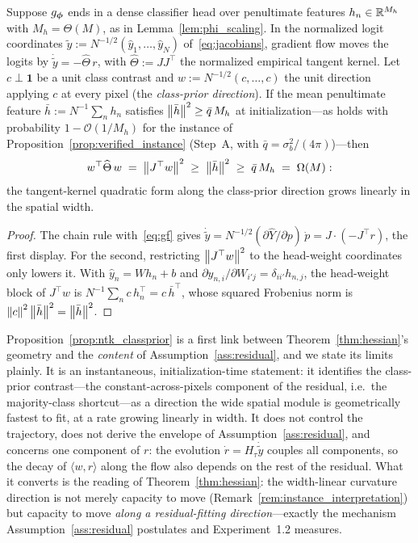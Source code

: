 \begin{proposition}
\label{prop:ntk_classprior}
Suppose $g_{\boldsymbol{\phi}}$ ends in a dense classifier head over penultimate
features $h_n \in \mathbb{R}^{M_h}$ with $M_h = \Theta(M)$, as in
Lemma~\ref{lem:phi_scaling}. In the normalized logit coordinates
$\tilde{y} := N^{-1/2}(\hat{y}_1, \dots, \hat{y}_N)$
of~\eqref{eq:jacobians}, gradient flow moves the logits by
$\dot{\tilde{y}} = -\widehat{\Theta}\,r$, with
$\widehat{\Theta} := J J^\top$ the normalized empirical tangent
kernel. Let $c \perp \mathbf{1}$ be a unit class contrast and
$w := N^{-1/2}(c, \dots, c)$ the unit direction applying $c$ at
every pixel (the \emph{class-prior direction}). If the mean
penultimate feature $\bar{h} := N^{-1}\sum_n h_n$ satisfies
$\left\lVert\bar{h}\right\rVert^2 \geq \bar{q}\,M_h$ at initialization---as holds
with probability $1 - \mathcal{O}(1/M_h)$ for the instance of
Proposition~\ref{prop:verified_instance} (Step~A, with
$\bar{q} = \sigma_b^2/(4\pi)$)---then
\[
    w^\top \widehat{\Theta}\,w
    \;=\; \left\lVert J^\top w\right\rVert^2
    \;\geq\; \left\lVert\bar{h}\right\rVert^2
    \;\geq\; \bar{q}\,M_h
    \;=\; \Omega(M):
\]
the tangent-kernel quadratic form along the class-prior direction
grows linearly in the spatial width.
\end{proposition}

\begin{proof}
The chain rule with~\eqref{eq:gf} gives
$\dot{\tilde{y}} = N^{-1/2}(\partial \hat{Y}/\partial p)\,\dot{p}
= J \cdot (-J^\top r)$, the first display. For the second,
restricting $\left\lVert J^\top w\right\rVert^2$ to the head-weight coordinates only
lowers it. With $\hat{y}_n = W h_n + b$ and
$\partial \hat{y}_{n,i}/\partial W_{i'j} = \delta_{ii'} h_{n,j}$,
the head-weight block of $J^\top w$ is
$N^{-1}\sum_n c\,h_n^\top = c\,\bar{h}^\top$, whose squared
Frobenius norm is $\left\lVert c\right\rVert^2 \left\lVert\bar{h}\right\rVert^2 = \left\lVert\bar{h}\right\rVert^2$.
\end{proof}

\begin{remark}
\label{rem:classprior_scope}
Proposition~\ref{prop:ntk_classprior} is a first link between
Theorem~\ref{thm:hessian}'s geometry and the \emph{content} of
Assumption~\ref{ass:residual}, and we state its limits plainly. It
is an instantaneous, initialization-time statement: it identifies
the class-prior contrast---the constant-across-pixels component of
the residual, i.e.\ the majority-class shortcut---as a direction
the wide spatial module is geometrically fastest to fit, at a rate
growing linearly in width. It does not control the trajectory, does
not derive the envelope of Assumption~\ref{ass:residual}, and
concerns one component of $r$: the evolution
$\dot{r} = H_\tau \dot{\tilde{y}}$ couples all components, so the
decay of $\langle w, r \rangle$ along the flow also depends on the
rest of the residual. What it converts is the reading of
Theorem~\ref{thm:hessian}: the width-linear curvature direction is
not merely capacity to move
(Remark~\ref{rem:instance_interpretation}) but capacity to move
\emph{along a residual-fitting direction}---exactly the mechanism
Assumption~\ref{ass:residual} postulates and Experiment~1.2
measures.
\end{remark}

